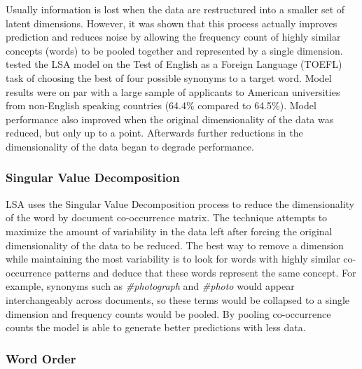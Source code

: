 \documentclass[man,floatsintext,donotrepeattitle]{apa6}
\begin{document}
Usually information is lost when the data are restructured into a smaller set of latent dimensions.
However, it was shown that this process actually improves prediction and reduces noise by allowing the frequency count of highly similar concepts (words) to be pooled together and represented by a single dimension.
\textcite{Landauer1997} tested the LSA model on the Test of English as a Foreign Language (TOEFL) task of choosing the best of four possible synonyms to a target word.
Model results were on par with a large sample of applicants to American universities from non-English speaking countries (\num{64.4}\% compared to \num{64.5}\%).
Model performance also improved when the original dimensionality of the data was reduced, but only up to a point.
Afterwards further reductions in the dimensionality of the data began to degrade performance.

\subsubsection{Singular Value Decomposition}

LSA uses the Singular Value Decomposition process to reduce the dimensionality of the word by document co-occurrence matrix.
The technique attempts to maximize the amount of variability in the data left after forcing the original dimensionality of the data to be reduced.
The best way to remove a dimension while maintaining the most variability is to look for words with highly similar co-occurrence patterns and deduce that these words represent the same concept.
For example, synonyms such as \emph{\#photograph} and \emph{\#photo} would appear interchangeably across documents, so these terms would be collapsed to a single dimension and frequency counts would be pooled.
By pooling co-occurrence counts the model is able to generate better predictions with less data.

\subsubsection{Word Order}
\end{document}
